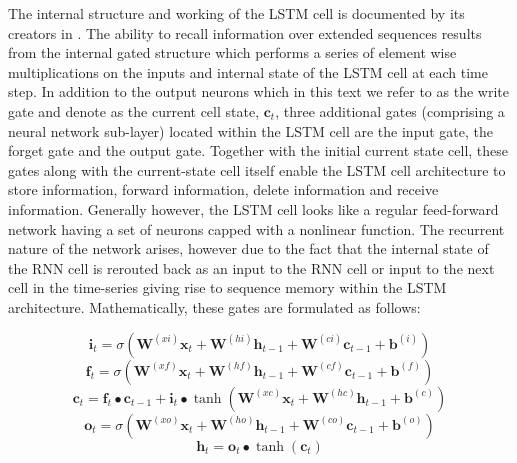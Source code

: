 The internal structure and working  of the LSTM cell is documented by its creators in \cite{sak2014long}. The ability to recall information over extended sequences results from the internal gated structure which performs a series of element wise multiplications on the inputs and internal state of the LSTM cell at each time step.  In addition to the output neurons which in this text we refer to as the write gate and denote as the current cell state, $\mathbf{c}_t$, three additional gates (comprising a neural network sub-layer) located within the LSTM cell are the input gate, the forget gate and the output gate.  Together with the initial current state cell, these gates along with the current-state cell itself enable the LSTM cell architecture to store information, forward information, delete information and receive information.  Generally however, the LSTM cell looks like a regular feed-forward network having a set of neurons capped with a nonlinear function.  The recurrent nature of the network arises, however due to the fact that the internal state of the RNN cell is rerouted back as an input to the RNN cell or input to the next cell in the time-series giving rise to sequence memory within the LSTM architecture. Mathematically, these gates are formulated as follows:

\begin{equation}
\mathbf{i}_t=\sigma(\mathbf{W}^{(xi)}\mathbf{x}_t+\mathbf{W}^{(hi)}\mathbf{h}_{t-1}+\mathbf{W}^{(ci)}\mathbf{c}_{t-1}+\mathbf{b}^{(i)})
\label{eqn_c3_lstm01}
\end{equation}
\begin{equation}
\mathbf{f}_t=\sigma(\mathbf{W}^{(xf)}\mathbf{x}_t+\mathbf{W}^{(hf)}\mathbf{h}_{t-1}+\mathbf{W}^{(cf)}\mathbf{c}_{t-1}+\mathbf{b}^{(f)})
\label{eqn_c3_lstm02}
\end{equation}
\begin{equation}
\mathbf{c}_t=\mathbf{f}_t\bullet\mathbf{c}_{t- 1}+\mathbf{i}_t\bullet\tanh(\mathbf{W}^{(xc)}\mathbf{x}_t+\mathbf{W}^{(hc)}\mathbf{h}_{t-1}+\mathbf{b}^{(c)})\label{eqn_c3_lstm03}
\end{equation}
\begin{equation}
\mathbf{o}_t=\sigma(\mathbf{W}^{(xo)}\mathbf{x}_t+\mathbf{W}^{(ho)}\mathbf{h}_{t-1}+\mathbf{W}^{(co)}\mathbf{c}_{t-1}+\mathbf{b}^{(o)})\label{eqn_c3_lstm04}\end{equation}
\begin{equation}
\mathbf{h}_t=\mathbf{o}_t\bullet\tanh{(\mathbf{c}_t)}
\label{eqn_c3_lstm05}
\end{equation}

